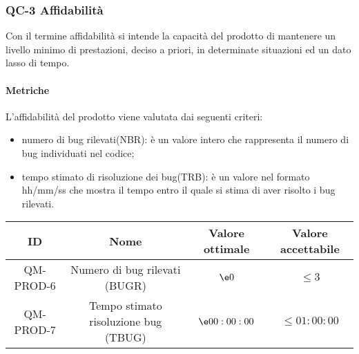 \subsubsection{QC-3 Affidabilità}
Con il termine affidabilità si intende la capacità del prodotto di mantenere un livello minimo di prestazioni, deciso a priori, in determinate situazioni ed un dato lasso di tempo.

	\paragraph{Metriche}
	L'affidabilità del prodotto viene valutata dai seguenti criteri:
	\begin{itemize}
		\item numero di bug rilevati(NBR): è un valore intero che rappresenta il numero di bug individuati nel codice;
		\item tempo stimato di risoluzione dei bug(TRB): è un valore nel formato hh/mm/ss che mostra il tempo entro il quale si stima di aver risolto i bug rilevati.
	\end{itemize}
	\begin{center}
		\begin{tabular}{|c|c|c|c|}
			\rowcolor{lighter-grayer}
			\hline
			ID & Nome & Valore ottimale & Valore accettabile \\
			\hline
			QM-PROD-6 & Numero di bug rilevati (BUGR) & \(\e 0\) &\(\le 3\) \\
			\hline
			QM-PROD-7 & Tempo stimato risoluzione bug (TBUG) & \(\e 00:00:00\) & \(\le 01:00:00\) \\
			\hline
		\end{tabular}
	\end{center}
